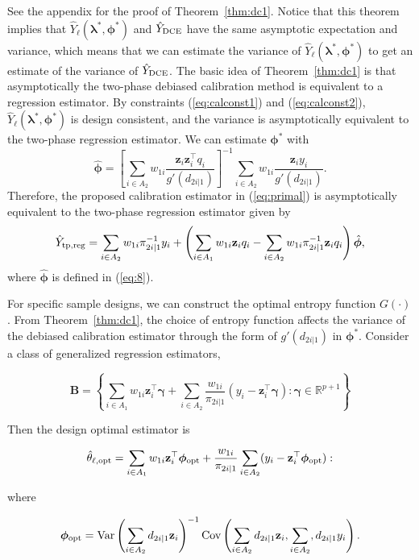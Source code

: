 \documentclass[12pt]{article}
\newcommand{\Cov}{{\text{Cov}}}
\newcommand{\Var}{{\text{Var}}}
\newcommand{\R}{\mathbb{R}}
\renewcommand{\bf}[1]{\mathbf{#1}}
\begin{document}
See the appendix for the proof of Theorem~\ref{thm:dc1}. Notice that this
theorem implies
that $\hat Y_{\ell}(\bm \lambda^*, \bm \phi^*)$ and $\hat Y_{\rm DCE}$ have
the same asymptotic expectation and variance, 
which means that we can estimate
the variance of $\hat Y_{\ell}(\bm \lambda^*, \bm \phi^*)$ to get an
estimate of the variance of $\hat Y_{\rm DCE}$. The basic idea of 
Theorem~\ref{thm:dc1} is that asymptotically the two-phase debiased calibration
method is equivalent to a regression estimator. By constraints 
(\ref{eq:calconst1}) and (\ref{eq:calconst2}), 
$\hat Y_{\ell}(\bm \lambda^*, \bm \phi^*)$ is design consistent, and the
variance is asymptotically equivalent to the two-phase regression estimator. 
We can estimate $\bm \phi^*$ with
\begin{equation}
\hat{\bm \phi} = 
\left[\sum_{i \in A_2} 
w_{1i}\frac{\bf z_i \bf z_i^\top q_i}{g'(d_{2i|1})}\right]^{-1}
\sum_{i \in A_2} w_{1i}\frac{\bf z_i y_i}{g'(d_{2i|1})}.
\label{eq:8}
\end{equation}
Therefore, the proposed calibration estimator in (\ref{eq:primal}) is asymptotically equivalent to the two-phase regression estimator given by 
  $$
  \hat Y_{\rm tp, reg}  = 
  \sum_{i \in A_2} w_{1i} \pi_{2i|1}^{-1} y_i
  + \left(\sum_{i \in A_1} w_{1i} \bf z_i q_i - 
  \sum_{i \in A_2} w_{1i} \pi_{2i|1}^{-1} \bf{z}_i q_i\right)\hat{\bm \phi},
  $$
  where $\hat{\bm \phi}$ is defined in (\ref{eq:8}). 

  
For specific sample designs, we can construct the optimal entropy function
$G(\cdot)$. From Theorem~\ref{thm:dc1}, the choice of entropy function affects
the variance of the debiased calibration estimator through the form of $g'(d_{2i|1})$
in $\bm \phi^*$. Consider a class of generalized regression estimators,

$$
\mathbf{B} = 
\left\{\sum_{i \in A_1} w_{1i} \bf{z}_i^\top \bm \gamma + 
\sum_{i \in A_2} \frac{w_{1i}}{\pi_{2i|1}}(y_i - \bf{z}_i^\top \bm \gamma):
\bm \gamma \in \R^{p+1}\right\}
$$

Then the design optimal estimator is 

$$
\hat \theta_{\ell, \rm{opt}} = 
\sum_{i \in A_1} w_{1i} \bf{z}_i^\top \bm \phi_{\rm opt} + 
\frac{w_{1i}}{\pi_{2i|1}}\sum_{i \in A_2} (y_i - \bf{z}_i^\top \bm \phi_{\rm opt}):
$$

where 

$$
\bm \phi_{\rm opt} = 
\Var\left(\sum_{i \in A_2} d_{2i|1} \bf{z}_i\right)^{-1} 
\Cov\left(\sum_{i \in A_2} d_{2i|1} \bf{z}_i, \sum_{i \in A_2}, d_{2i|1} y_i \right).
$$
\end{document}

